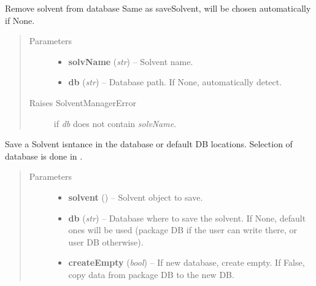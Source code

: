 \documentclass[letterpaper,10pt,english]{sphinxmanual}
\begin{document}
\begin{fulllineitems}
\begin{fulllineitems}
\label{solvents:pyMDMix.Solvents.SolventManager.removeSolvent}
Remove solvent from database
Same as saveSolvent,  will be chosen automatically if None.
\begin{quote}\begin{description}
\item[{Parameters}] \leavevmode\begin{itemize}
\item {} 
\textbf{solvName} (\emph{str}) -- Solvent name.

\item {} 
\textbf{db} (\emph{str}) -- Database path. If None, automatically detect.

\end{itemize}

\item[{Raises SolventManagerError}] \leavevmode
if \emph{db} does not contain \emph{solvName}.

\end{description}\end{quote}

\end{fulllineitems}


\begin{fulllineitems}
\label{solvents:pyMDMix.Solvents.SolventManager.saveSolvent}
Save a Solvent isntance in the database  or default DB locations.
Selection of database is done in .
\begin{quote}\begin{description}
\item[{Parameters}] \leavevmode\begin{itemize}
\item {} 
\textbf{solvent} ({\hyperref[solvents:pyMDMix.Solvents.Solvent]{}}) -- Solvent object to save.

\item {} 
\textbf{db} (\emph{str}) -- Database where to save the solvent.
If None, default ones will be used (package DB if
the user can write there, or user DB otherwise).

\item {} 
\textbf{createEmpty} (\emph{bool}) -- If new database, create empty.
If False, copy data from package DB to the new DB.

\end{itemize}

\end{description}\end{quote}

\end{fulllineitems}


\end{fulllineitems}
\end{document}
